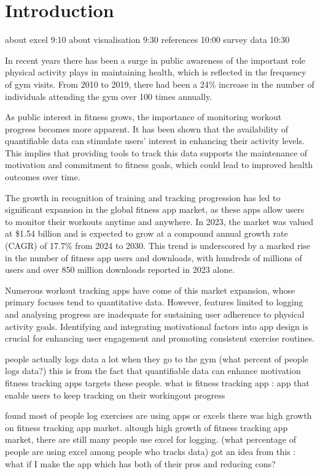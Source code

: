 \chapter{Introduction}

about excel 9:10
about visualisation 9:30
references 10:00
survey data 10:30


\label{chap:context}
\noindent
In recent years there has been a surge in public awareness of the important role physical activity plays in maintaining health, which is reflected in the frequency of gym visits. From 2010 to 2019, there had been a 24\% increase in the number of individuals attending the gym over 100 times annually.

As public interest in fitness grows, the importance of monitoring workout progress becomes more apparent. It has been shown that the availability of quantifiable data can stimulate users' interest in enhancing their activity levels. This implies that providing tools to track this data supports the maintenance of motivation and commitment to fitness goals, which could lead to improved health outcomes over time.

The growth in recognition of training and tracking progression has led to significant expansion in the global fitness app market, as these apps allow users to monitor their workouts anytime and anywhere. In 2023, the market was valued at \$1.54 billion and is expected to grow at a compound annual growth rate (CAGR) of 17.7\% from 2024 to 2030. This trend is underscored by a marked rise in the number of fitness app users and downloads, with hundreds of millions of users and over 850 million downloads reported in 2023 alone. 

Numerous workout tracking apps have come of this market expansion, whose primary focuses tend to quantitative data. However, features limited to logging and analysing progress are inadequate for sustaining user adherence to physical activity goals. Identifying and integrating motivational factors into app design is crucial for enhancing user engagement and promoting consistent exercise routines.



people actually logs data a lot when they go to the gym (what percent of people logs data?) 
this is from the fact that quantifiable data can enhance motivation
fitness tracking apps targets these people. 
what is fitness tracking app : app that enable users to keep tracking on their workingout progress

found most of people log exercises are using apps or excels
there was high growth on fitness tracking app market.
altough high growth of fitness tracking app market, there are still many people use excel for logging. (what percentage of people are using excel among people who tracks data)
got an idea from this : 
what if I make the app which has both of their pros and reducing cons?

